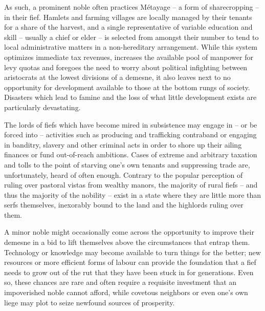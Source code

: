 As such, a prominent noble often practices Métayage – a form of sharecropping – in their fief. Hamlets and farming villages are locally managed by their tenants for a share of the harvest, and a single representative of variable education and skill – usually a chief or elder – is selected from amongst their number to tend to local administrative matters in a non-hereditary arrangement. While this system optimizes immediate tax revenues, increases the available pool of manpower for levy quotas and foregoes the need to worry about political infighting between aristocrats at the lowest divisions of a demesne, it also leaves next to no opportunity for development available to those at the bottom rungs of society. Disasters which lead to famine and the loss of what little development exists are particularly devastating.

 

The lords of fiefs which have become mired in subsistence may engage in – or be forced into – activities such as producing and trafficking contraband or engaging in banditry, slavery and other criminal acts in order to shore up their ailing finances or fund out-of-reach ambitions. Cases of extreme and arbitrary taxation and tolls to the point of starving one’s own tenants and suppressing trade are, unfortunately, heard of often enough. Contrary to the popular perception of ruling over pastoral vistas from wealthy manors, the majority of rural fiefs – and thus the majority of the nobility – exist in a state where they are little more than serfs themselves, inexorably bound to the land and the highlords ruling over them.

 

A minor noble might occasionally come across the opportunity to improve their demesne in a bid to lift themselves above the circumstances that entrap them. Technology or knowledge may become available to turn things for the better; new resources or more efficient forms of labour can provide the foundation that a fief needs to grow out of the rut that they have been stuck in for generations. Even so, these chances are rare and often require a requisite investment that an impoverished noble cannot afford, while covetous neighbors or even one’s own liege may plot to seize newfound sources of prosperity.